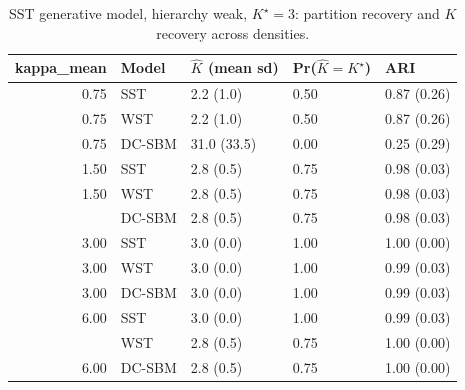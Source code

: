 \begin{table}
\centering
\caption{SST generative model, hierarchy weak, $K^\star=3$: partition recovery and $K$ recovery across densities.}
\centering
\begin{tabular}[t]{rllll}
\toprule
kappa_mean & Model & $\hat K$ (mean sd) & Pr($\hat K = K^\star$) & ARI\\
\midrule
0.75 & SST & 2.2 (1.0) & 0.50 & 0.87 (0.26)\\
0.75 & WST & 2.2 (1.0) & 0.50 & 0.87 (0.26)\\
0.75 & DC-SBM & 31.0 (33.5) & 0.00 & 0.25 (0.29)\\
1.50 & SST & 2.8 (0.5) & 0.75 & 0.98 (0.03)\\
1.50 & WST & 2.8 (0.5) & 0.75 & 0.98 (0.03)\\
\addlinespace
1.50 & DC-SBM & 2.8 (0.5) & 0.75 & 0.98 (0.03)\\
3.00 & SST & 3.0 (0.0) & 1.00 & 1.00 (0.00)\\
3.00 & WST & 3.0 (0.0) & 1.00 & 0.99 (0.03)\\
3.00 & DC-SBM & 3.0 (0.0) & 1.00 & 0.99 (0.03)\\
6.00 & SST & 3.0 (0.0) & 1.00 & 0.99 (0.03)\\
\addlinespace
6.00 & WST & 2.8 (0.5) & 0.75 & 1.00 (0.00)\\
6.00 & DC-SBM & 2.8 (0.5) & 0.75 & 1.00 (0.00)\\
\bottomrule
\end{tabular}
\end{table}
